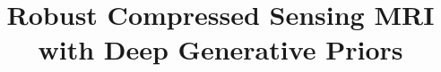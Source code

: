 \newcommand{\Tr}{ \text{Tr} }

\newcommand{\by}{\mathbf y}
\newcommand{\bw}{\mathbf w}
\newcommand{\bv}{\mathbf v}
\newcommand{\bu}{\mathbf u}
\newcommand{\ba}{\mathbf a}

\newcommand{\beps}{\boldsymbol{\epsilon}}

\DeclareMathOperator{\cov}{Cov}
\DeclareMathOperator{\logcov}{\log \cov}
\DeclareMathOperator*{\ex}{\bbE}
\DeclareMathOperator*{\var}{Var}
\DeclareMathOperator*{\pr}{\bbP}

\makeatletter
\newcommand{\printfnsymbol}[1]{%
  \textsuperscript{\@fnsymbol{#1}}%
}
\makeatother

\title{Robust Compressed Sensing MRI with Deep Generative Priors}

%

